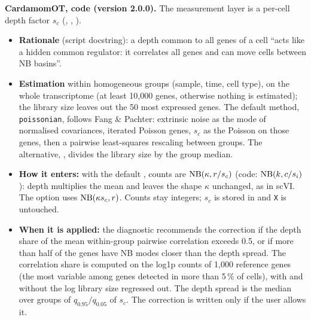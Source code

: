 \documentclass[11pt,a4paper]{article}
\begin{document}
\textbf{CardamomOT, code (version 2.0.0).} The measurement layer is a per-cell depth factor $s_c$
(, , ).
\begin{itemize}
  \item \textbf{Rationale} (script docstring): a depth common to all genes of a cell \enquote{acts like a
        hidden common regulator: it correlates all genes and can move cells between NB basins}.
  \item \textbf{Estimation} within homogeneous groups (sample, time, cell type), on the whole transcriptome
        (at least 10{,}000 genes, otherwise nothing is estimated); the library size leaves out the 50 most
        expressed genes. The default method, \texttt{poissonian}, follows Fang \& Pachter: extrinsic noise
        as the mode of normalised covariances, iterated Poisson genes, $s_c$ as the Poisson
         on those genes, then a pairwise least-squares rescaling between groups. The
        alternative, , divides the library size by the group median.
  \item \textbf{How it enters:} with the default , counts are
        $\operatorname{NB}(\kappa,r/s_c)$ (code: $\operatorname{NB}(k,c/s_i)$): depth multiplies the mean and leaves the shape
        $\kappa$ unchanged, as in scVI. The option  uses $\operatorname{NB}(\kappa s_c,r)$.
        Counts stay integers; $s_c$ is stored in  and \texttt{X} is untouched.
  \item \textbf{When it is applied:} the diagnostic recommends the correction if the depth share of the
        mean within-group pairwise correlation exceeds 0.5, or if more than half of the genes have NB modes
        closer than the depth spread. The correlation share is computed on the log1p counts of 1{,}000
        reference genes (the most variable among genes detected in more than 5\,\% of cells), with and
        without the log library size regressed out. The depth spread is the median over groups of
        $q_{0.95}/q_{0.05}$ of $s_c$. The correction is written only if the user allows it.
\end{itemize}
\end{document}
